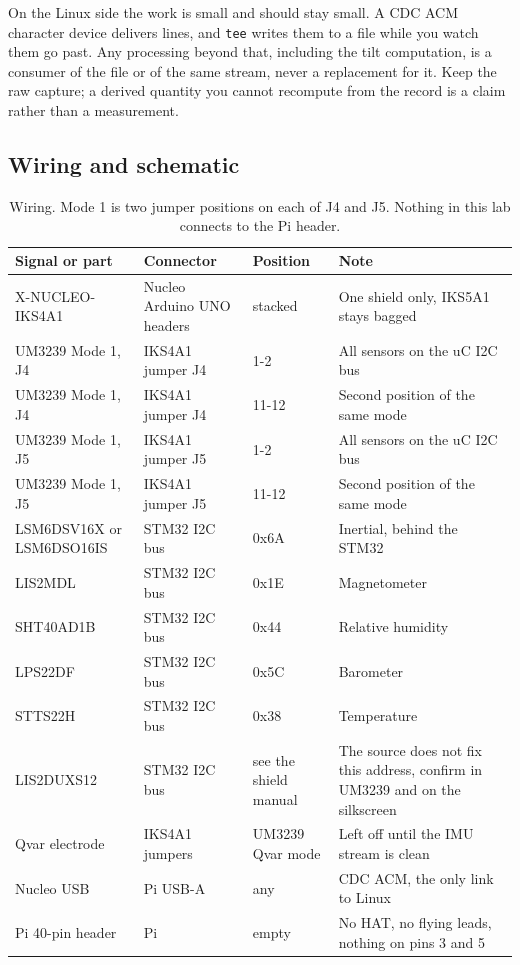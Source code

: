 On the Linux side the work is small and should stay small. A CDC ACM character device
delivers lines, and \texttt{tee} writes them to a file while you watch them go past. Any
processing beyond that, including the tilt computation, is a consumer of the file or of
the same stream, never a replacement for it. Keep the raw capture; a derived quantity you
cannot recompute from the record is a claim rather than a measurement.

\subsection*{Wiring and schematic}


\begin{table}[H]\centering\small
\begin{tabular}{p{40mm}p{28mm}p{22mm}p{58mm}}
\toprule
Signal or part & Connector & Position & Note \\
\midrule
X-NUCLEO-IKS4A1 & Nucleo Arduino UNO headers & stacked & One shield only, IKS5A1 stays bagged \\
UM3239 Mode 1, J4 & IKS4A1 jumper J4 & 1-2 & All sensors on the uC I2C bus \\
UM3239 Mode 1, J4 & IKS4A1 jumper J4 & 11-12 & Second position of the same mode \\
UM3239 Mode 1, J5 & IKS4A1 jumper J5 & 1-2 & All sensors on the uC I2C bus \\
UM3239 Mode 1, J5 & IKS4A1 jumper J5 & 11-12 & Second position of the same mode \\
LSM6DSV16X or LSM6DSO16IS & STM32 I2C bus & 0x6A & Inertial, behind the STM32 \\
LIS2MDL & STM32 I2C bus & 0x1E & Magnetometer \\
SHT40AD1B & STM32 I2C bus & 0x44 & Relative humidity \\
LPS22DF & STM32 I2C bus & 0x5C & Barometer \\
STTS22H & STM32 I2C bus & 0x38 & Temperature \\
LIS2DUXS12 & STM32 I2C bus & see the shield manual & The source does not fix this address, confirm in UM3239 and on the silkscreen \\
Qvar electrode & IKS4A1 jumpers & UM3239 Qvar mode & Left off until the IMU stream is clean \\
Nucleo USB & Pi USB-A & any & CDC ACM, the only link to Linux \\
Pi 40-pin header & Pi & empty & No HAT, no flying leads, nothing on pins 3 and 5 \\
\bottomrule
\end{tabular}
\caption{Wiring. Mode 1 is two jumper positions on each of J4 and J5. Nothing in this lab
connects to the Pi header.}
\end{table}

